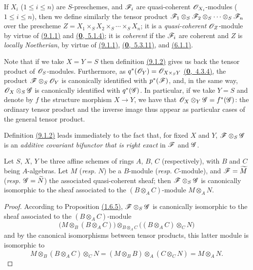 If $X_i$ ($1\leqslant i\leqslant n$) are $S$-preschemes, and $\mathscr{F}_i$ are quasi-coherent
$\mathscr{O}_{X_i}$-modules ($1\leqslant i\leqslant n$), then we define similarly the tensor product
$\mathscr{F}_1\otimes_S\mathscr{F}_2\otimes_S\cdots\otimes_S\mathscr{F}_n$ over the
prescheme $Z=X_1\times_S X_2\times_S\cdots\times_S X_n$; it is a
{\em quasi-coherent} $\mathscr{O}_Z$-module by virtue of \hyperref[prop-1.9.1.1]{(9.1.1)} and
\hyperref[env-0.5.1.4]{(\textbf{0},~5.1.4)}; it is {\em coherent} if the $\mathscr{F}_i$ are coherent and
$Z$ is {\em locally Noetherian}, by virtue of \hyperref[prop-1.9.1.1]{(9.1.1)},
\hyperref[env-0.5.3.11]{(\textbf{0},~5.3.11)}, and \hyperref[env-1.6.1.1]{(6.1.1)}.

Note that if we take $X=Y=S$ then definition \hyperref[defn-1.9.1.2]{(9.1.2)} gives us back the tensor
product of $\mathscr{O}_S$-modules. Furthermore, as $q^*(\mathscr{O}_Y)=\mathscr{O}_{X\times_S Y}$
\hyperref[env-0.4.3.4]{(\textbf{0},~4.3.4)}, the product $\mathscr{F}\otimes_S\mathscr{O}_Y$ is canonically
identified with $p^*(\mathscr{F})$, and, in the same way,
$\mathscr{O}_X\otimes_S\mathscr{G}$ is canonically identified with $q^*(\mathscr{G})$. In
particular, if we take $Y=S$ and denote by $f$ the structure morphism $X\to Y$,
we have that $\mathscr{O}_X\otimes_Y\mathscr{G}=f^*(\mathscr{G})$: the ordinary tensor
product and the inverse image thus appear as particular cases of the general
tensor product.

Definition \hyperref[defn-1.9.1.2]{(9.1.2)} leads immediately to the fact that, for fixed $X$ and
$Y$, $\mathscr{F}\otimes_S\mathscr{G}$ is an {\em additive covariant bifunctor that
is right exact} in $\mathscr{F}$ and $\mathscr{G}$.

\begin{prop}[9.1.3]
\label{prop-1.9.1.3}
Let $S$, $X$, $Y$ be three affine schemes of rings
$A$, $B$, $C$ (respectively), with $B$ and $C$ being $A$-algebras. Let $M$
({\em resp.} $N$) be a $B$-module ({\em resp.} $C$-module), and
$\mathscr{F}=\widetilde{M}$ ({\em resp.} $\mathscr{G}=\widetilde{N}$) the
associated quasi-coherent sheaf; then $\mathscr{F}\otimes_S\mathscr{G}$ is
canonically isomorphic to the sheaf associated to the $(B\otimes_A C)$-module
$M\otimes_A N$.
\end{prop}

\begin{proof}
\label{proof-prop-1.9.1.3}
According to Proposition \hyperref[prop-1.1.6.5]{(1.6.5)}, $\mathscr{F}\otimes_S\mathscr{G}$
is canonically isomorphic to the sheaf associated to the $(B\otimes_A C)$-module
\[
  \big(M\otimes_B(B\otimes_A C)\big)\otimes_{B\otimes_A C}\big((B\otimes_A C)\otimes_C N\big)
\]
and by the canonical isomorphisms between tensor
products, this latter module is isomorphic to
\[
  M\otimes_B(B\otimes_A C)\otimes_C N=(M\otimes_B B)\otimes_A(C\otimes_C N)=M\otimes_A N.
\]
\end{proof}

